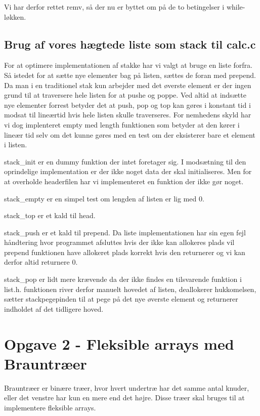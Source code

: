 \documentclass[10pt,a4paper,danish]{article}
\begin{document}
Vi har derfor rettet remv, så der nu er byttet om på de to betingelser i while-løkken.

\subsection{Brug af vores hægtede liste som stack til calc.c}
For at optimere implementationen af stakke har vi valgt at bruge en liste forfra.
Så istedet for at sætte nye elementer bag på listen, sættes de foran med prepend.
Da man i en traditionel stak kun arbejder med det øverste element er der ingen grund til at traversere hele listen for at pushe og poppe. Ved altid at indsætte nye elementer forrest betyder det at push, pop og top kan gøres i konstant tid i modsat til lineærtid hvis hele listen skulle traverseres. For nemhedens skyld har vi dog implenteret empty med length funktionen som betyder at den kører i lineær tid selv om det kunne gøres med en test om der eksisterer bare et element i listen.


stack\_init er en dummy funktion der intet foretager sig.
I modsætning til den oprindelige implementation er der ikke noget data der skal initialiseres. Men for at overholde headerfilen har vi implementeret en funktion der ikke gør noget.

stack\_empty er en simpel test om lengden af listen er lig med 0.

stack\_top er et kald til head.

stack\_push er et kald til prepend.
Da liste implementationen har sin egen fejl håndtering hvor programmet afsluttes hvis der ikke kan allokeres plads vil prepend funktionen have allokeret plads korrekt hvis den returnerer og vi kan derfor altid returnere 0.

stack\_pop er lidt mere krævende da der ikke findes en tilsvarende funktion i list.h.
funktionen river derfor manuelt hovedet af listen, deallokerer hukkomelsen, sætter stackpegepinden til at pege på det nye øverste element og returnerer indholdet af det tidligere hoved.

\section{Opgave 2 - Fleksible arrays med Brauntræer}
Brauntræer er binære træer, hvor hvert undertræ har det samme antal knuder, eller det venstre har kun en mere end det højre. Disse træer skal bruges til at implementere fleksible arrays.
\end{document}
